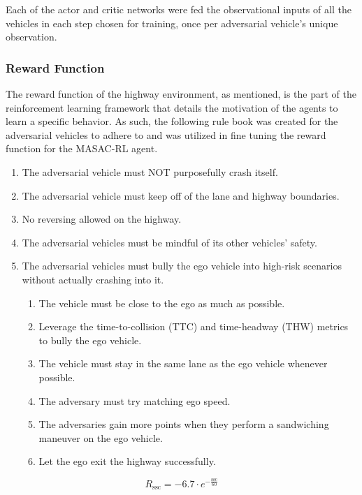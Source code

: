 \documentclass[12pt, a4paper]{report}
\begin{document}
Each of the actor and critic networks
were fed the observational inputs of all the vehicles in each step chosen for training, once per adversarial 
vehicle's unique observation.




\subsubsection{Reward Function}

The reward function of the highway environment, as mentioned, is the part of the reinforcement learning
framework that details the motivation of the agents to learn a specific behavior.
As such, the following rule book was created for the adversarial vehicles to adhere to and was utilized in
fine tuning the reward function for the MASAC-RL agent.

\begin{enumerate}
    \item The adversarial vehicle must NOT purposefully crash itself.
    \item The adversarial vehicle must keep off of the lane and highway boundaries.
    \item No reversing allowed on the highway.
    \item The adversarial vehicles must be mindful of its other vehicles' safety.
    \item The adversarial vehicles must bully the ego vehicle into high-risk scenarios without actually crashing into it.
    \begin{enumerate}
        \item The vehicle must be close to the ego as much as possible.
        \item Leverage the time-to-collision (TTC) and time-headway (THW) metrics to bully the ego vehicle.
        \item The vehicle must stay in the same lane as the ego vehicle whenever possible.
        \item The adversary must try matching ego speed.
        \item The adversaries gain more points when they perform a sandwiching maneuver on the ego vehicle.
        \item Let the ego exit the highway successfully.
    \end{enumerate}
\end{enumerate}

\begin{equation}
    R_{\mathrm{ssc}} = -6.7 \cdot e^{-\frac{\mathrm{ssc}}{60}}
\end{equation}
\end{document}
